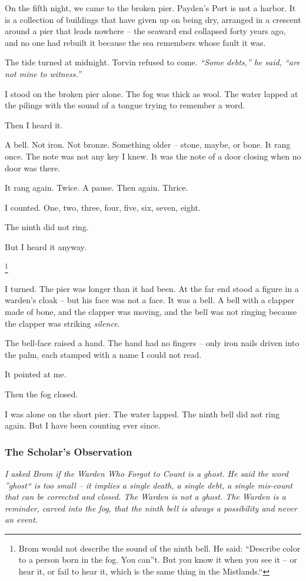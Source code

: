 \documentclass[12pt]{article}
\begin{document}
On the fifth night, we came to the broken pier. Payden's Port is not a harbor. It is a collection of buildings that have given up on being dry, arranged in a crescent around a pier that leads nowhere -- the seaward end collapsed forty years ago, and no one had rebuilt it because the sea remembers whose fault it was.

The tide turned at midnight. Torvin refused to come. \textit{``Some debts,'' he said, ``are not mine to witness.''}

I stood on the broken pier alone. The fog was thick as wool. The water lapped at the pilings with the sound of a tongue trying to remember a word.

Then I heard it.

A bell. Not iron. Not bronze. Something older -- stone, maybe, or bone. It rang once. The note was not any key I knew. It was the note of a door closing when no door was there.

It rang again. Twice. A pause. Then again. Thrice.

I counted. One, two, three, four, five, six, seven, eight.

The ninth did not ring.

But I heard it anyway.

\footnote{Brom would not describe the sound of the ninth bell. He said: ``Describe color to a person born in the fog. You can''t. But you know it when you see it -- or hear it, or fail to hear it, which is the same thing in the Mistlands.``}

I turned. The pier was longer than it had been. At the far end stood a figure in a warden's cloak -- but his face was not a face. It was a bell. A bell with a clapper made of bone, and the clapper was moving, and the bell was not ringing because the clapper was striking \textit{silence}.

The bell-face raised a hand. The hand had no fingers -- only iron nails driven into the palm, each stamped with a name I could not read.

It pointed at me.

Then the fog closed.

I was alone on the short pier. The water lapped. The ninth bell did not ring again. But I have been counting ever since.

\subsubsection{The Scholar's Observation}
\textit{I asked Brom if the Warden Who Forgot to Count is a ghost. He said the word ''ghost`` is too small -- it implies a single death, a single debt, a single mis-count that can be corrected and closed. The Warden is not a ghost. The Warden is a \textit{reminder}, carved into the fog, that the ninth bell is always a possibility and never an event.}
\end{document}
